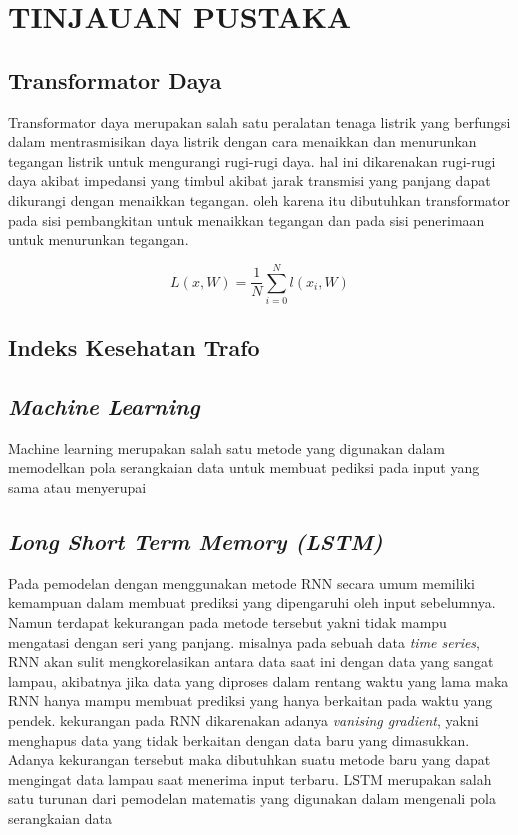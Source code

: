 \chapter{TINJAUAN PUSTAKA}
\label{BAB2:tinjauan}
\section{Transformator Daya}

Transformator daya merupakan salah satu peralatan tenaga listrik yang berfungsi dalam mentrasmisikan daya listrik dengan cara menaikkan dan menurunkan tegangan listrik untuk mengurangi rugi-rugi daya. hal ini dikarenakan rugi-rugi daya akibat impedansi yang timbul akibat jarak transmisi yang panjang dapat dikurangi dengan menaikkan tegangan. oleh karena itu dibutuhkan transformator pada sisi pembangkitan untuk menaikkan tegangan dan pada sisi penerimaan untuk menurunkan tegangan.






\begin{equation}
  L(x,W)= \frac{1}{N}\sum\limits_{i=0}^{N} l(x_i,W)   
  \label{func:loss}
\end{equation}

\section{Indeks Kesehatan Trafo}
\section{\textit{Machine Learning}}
Machine learning merupakan salah satu metode yang digunakan dalam memodelkan pola serangkaian data untuk membuat pediksi pada input yang sama atau menyerupai 
\section{\textit{Long Short Term Memory (LSTM)}}
Pada pemodelan dengan menggunakan metode RNN secara umum memiliki kemampuan dalam membuat prediksi yang dipengaruhi oleh input sebelumnya. Namun terdapat kekurangan pada metode tersebut yakni tidak mampu mengatasi dengan  seri yang panjang. misalnya pada sebuah data \textit{time series}, RNN akan sulit mengkorelasikan antara data saat ini dengan data yang sangat lampau, akibatnya jika data yang diproses dalam rentang waktu yang lama maka RNN hanya mampu membuat prediksi yang hanya berkaitan pada waktu yang pendek. kekurangan pada RNN dikarenakan adanya \textit{vanising gradient}, yakni menghapus data yang tidak berkaitan dengan data baru yang dimasukkan. Adanya kekurangan tersebut maka dibutuhkan suatu metode baru yang dapat mengingat data lampau saat menerima input terbaru. 
LSTM merupakan salah satu turunan dari pemodelan matematis yang digunakan dalam mengenali pola serangkaian data 

